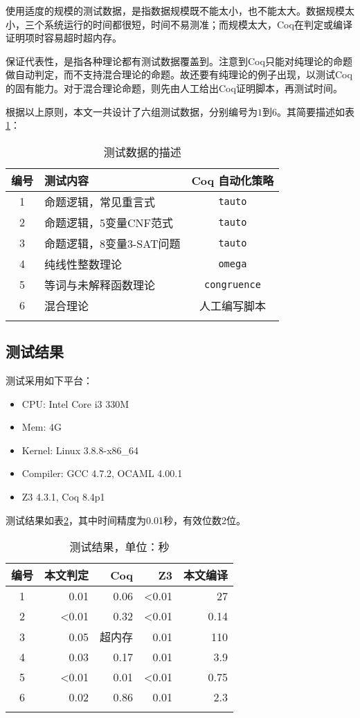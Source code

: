 使用适度的规模的测试数据，是指数据规模既不能太小，也不能太大。数据规模太小，三个系统运行的时间都很短，时间不易测准；而规模太大，Coq在判定或编译证明项时容易超时超内存。

保证代表性，是指各种理论都有测试数据覆盖到。注意到Coq只能对纯理论的命题做自动判定，而不支持混合理论的命题。故还要有纯理论的例子出现，以测试Coq的固有能力。对于混合理论命题，则先由人工给出Coq证明脚本，再测试时间。

根据以上原则，本文一共设计了六组测试数据，分别编号为$1$到$6$。其简要描述如表\ref{tab:test}：
\begin{table}[!ht]
  \caption{测试数据的描述}
  \label{tab:test}
  \centering
  \begin{tabular}{clc}
    \whline
    编号 & 测试内容 & Coq 自动化策略\\
    \hline
    1 & 命题逻辑，常见重言式 & \texttt{tauto} \\
    2 & 命题逻辑，5变量CNF范式 & \texttt{tauto} \\
    3 & 命题逻辑，8变量3-SAT问题 & \texttt{tauto} \\
    4 & 纯线性整数理论 & \texttt{omega} \\
    5 & 等词与未解释函数理论 & \texttt{congruence} \\
    6 & 混合理论 & 人工编写脚本 \\
    \whline
  \end{tabular}
\end{table}

\subsection{测试结果}
测试采用如下平台：
\begin{itemize}
  \item CPU: Intel Core i3 330M
  \item Mem: 4G
  \item Kernel: Linux 3.8.8-x86\_64
  \item Compiler: GCC 4.7.2, OCAML 4.00.1
  \item Z3 4.3.1, Coq 8.4p1
\end{itemize}

测试结果如表\ref{tab:res}，其中时间精度为0.01秒，有效位数2位。
\begin{table}[!ht]
  \caption{测试结果，单位：秒}
  \label{tab:res}
  \centering
  \begin{tabular}{crrrr}
    \whline
    编号 & 本文判定 & Coq & Z3 & 本文编译 \\
    \hline
    1 & 0.01 & 0.06 & <0.01 & 27 \\
    2 & <0.01 & 0.32 & <0.01 & 0.14 \\
    3 & 0.05 & 超内存 & 0.01 & 110 \\
    4 & 0.03 & 0.17 & 0.01 & 3.9 \\
    5 & <0.01 & 0.01 & <0.01 & 0.75 \\
    6 & 0.02 & 0.86 & 0.01 & 2.3 \\
    \whline
  \end{tabular}
\end{table}

